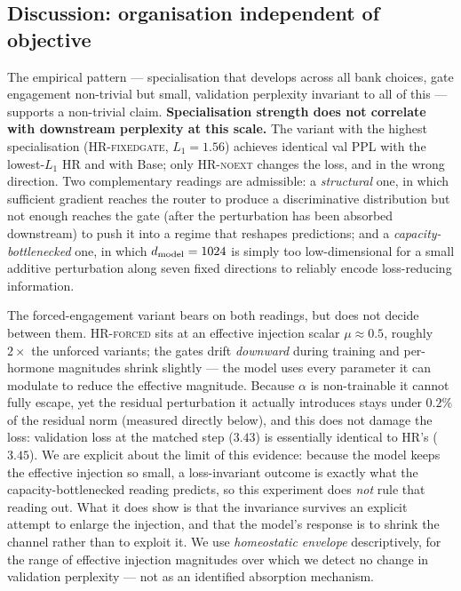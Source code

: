\subsection{Discussion: organisation independent of objective}

The empirical pattern --- specialisation that develops across all bank choices, gate engagement non-trivial but small, validation perplexity invariant to all of this --- supports a non-trivial claim. \textbf{Specialisation strength does not correlate with downstream perplexity at this scale.} The variant with the highest specialisation (\textsc{HR-fixedgate}, $L_1 = 1.56$) achieves identical val PPL with the lowest-$L_1$ \textsc{HR} and with Base; only \textsc{HR-noext} changes the loss, and in the wrong direction. Two complementary readings are admissible: a \emph{structural} one, in which sufficient gradient reaches the router to produce a discriminative distribution but not enough reaches the gate (after the perturbation has been absorbed downstream) to push it into a regime that reshapes predictions; and a \emph{capacity-bottlenecked} one, in which $d_{\text{model}} = 1024$ is simply too low-dimensional for a small additive perturbation along seven fixed directions to reliably encode loss-reducing information.

The forced-engagement variant bears on both readings, but does not decide between them. \textsc{HR-forced} sits at an effective injection scalar $\mu \approx 0.5$, roughly $2\times$ the unforced variants; the gates drift \emph{downward} during training and per-hormone magnitudes shrink slightly --- the model uses every parameter it can modulate to reduce the effective magnitude. Because $\alpha$ is non-trainable it cannot fully escape, yet the residual perturbation it actually introduces stays under $0.2\%$ of the residual norm (measured directly below), and this does not damage the loss: validation loss at the matched step ($3.43$) is essentially identical to \textsc{HR}'s ($3.45$). We are explicit about the limit of this evidence: because the model keeps the effective injection so small, a loss-invariant outcome is exactly what the capacity-bottlenecked reading predicts, so this experiment does \emph{not} rule that reading out. What it does show is that the invariance survives an explicit attempt to enlarge the injection, and that the model's response is to shrink the channel rather than to exploit it. We use \emph{homeostatic envelope} descriptively, for the range of effective injection magnitudes over which we detect no change in validation perplexity --- not as an identified absorption mechanism.

